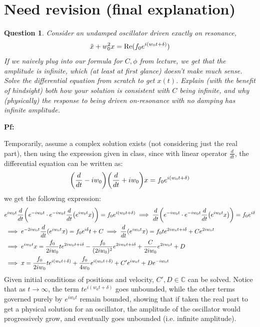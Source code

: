 \documentclass{article}
\newtheorem{question}{Question}
\newcommand{\CC}{\mathbb{C}}
\DeclarePairedDelimiter{\paran}{(}{)}%
\newcommand{\Real}{\textmd{Re}}
\begin{document}
\break

\section{Need revision (final explanation)}
\begin{question}\label{q5}
    Consider an \emph{undamped oscillator} driven exactly on resonance,
    $$\ddot x+w_0^2 x=\Real(f_0e^{i(w_0t+\delta)})$$
    If we naively plug into our formula for $C,\phi$ from lecture, we get that the amplitude is infinite, which (at least at first glance) doesn't make much sense. Solve the differential equation from scratch to get $x(t)$. Explain (with the benefit of hindsight) both how your solution is consistent with $C$ being infinite, and why (physically) the response to being driven on-resonance with no damping has infinite amplitude.
\end{question}

\textbf{Pf:}

Temporarily, assume a complex solution exists (not considering just the real part), then using the expression given in class, since with linear operator $\frac{d}{dt}$, the differential equation can be written as:
\begin{equation}
    \paran*{\frac{d}{dt}-iw_0}\paran*{\frac{d}{dt}+iw_0}x = f_0e^{i(w_0t+\delta)}
\end{equation}
 we get the following expression:
\begin{align}
    &e^{iw_0t}\frac{d}{dt}\paran*{e^{-iw_0t}\cdot e^{-iw_0t}\frac{d}{dt}\paran*{e^{iw_0t}x}}=f_0e^{i(w_0t+\delta)}\implies \frac{d}{dt}\paran*{e^{-iw_0t}\cdot e^{-iw_0t}\frac{d}{dt}\paran*{e^{iw_0t}x}} = f_0e^{i\delta}\\
    &\implies e^{-2iw_0t}\frac{d}{dt}(e^{iw_0t}x) = f_0e^{i\delta}t+C \implies \frac{d}{dt}(e^{iw_0t}x) = f_0te^{2iw_0t+i\delta}+Ce^{2iw_0t}\\
    &\implies e^{iw_0t}x = \frac{f_0}{2iw_0}te^{2iw_0t+i\delta} - \frac{f_0}{(2iw_0)^2}e^{2iw_0t+i\delta}+\frac{C}{2iw_0}e^{2iw_0t}+D\\
    &\implies x = \frac{f_0}{2iw_0}te^{i(w_0t+\delta)}+\frac{f_0}{4w_0}e^{i(w_0t+\delta)} + C'e^{iw_0t}+De^{-iw_0t}
\end{align}
Given initial conditions of positions and velocity, $C',D\in \CC$ can be solved. Notice that as $t\rightarrow\infty$, the term $te^{i(w_0t+\delta)}$ goes unbounded, while the other terms governed purely by $e^{iw_0t}$ remain bounded, showing that if taken the real part to get a physical solution for an oscillator, the amplitude of the oscillator would progressively grow, and eventually goes unbounded (i.e. infinite amplitude).
\end{document}

